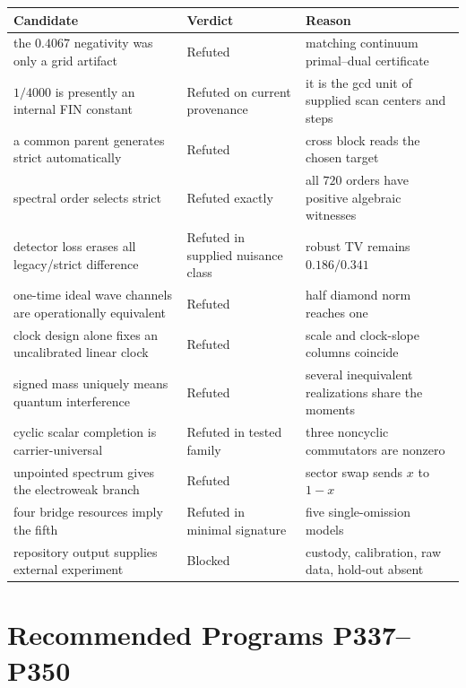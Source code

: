 \documentclass[11pt,a4paper,openany]{report}
\begin{document}
\begin{center}
\begingroup\small
\setlength{\tabcolsep}{2.5pt}
\renewcommand{\arraystretch}{1.16}
\begin{longtable}{@{}p{}p{}p{}@{}}
\toprule
\textbf{Candidate} & \textbf{Verdict} & \textbf{Reason} \\
\midrule
\endhead
the \(0.4067\) negativity was only a grid artifact & Refuted & matching continuum primal--dual certificate \\
\(1/4000\) is presently an internal FIN constant & Refuted on current provenance & it is the gcd unit of supplied scan centers and steps \\
a common parent generates strict automatically & Refuted & cross block reads the chosen target \\
spectral order selects strict & Refuted exactly & all \(720\) orders have positive algebraic witnesses \\
detector loss erases all legacy/\allowbreak{}strict difference & Refuted in supplied nuisance class & robust TV remains \(0.186/0.341\) \\
one-time ideal wave channels are operationally equivalent & Refuted & half diamond norm reaches one \\
clock design alone fixes an uncalibrated linear clock & Refuted & scale and clock-slope columns coincide \\
signed mass uniquely means quantum interference & Refuted & several inequivalent realizations share the moments \\
cyclic scalar completion is carrier-universal & Refuted in tested family & three noncyclic commutators are nonzero \\
unpointed spectrum gives the electroweak branch & Refuted & sector swap sends \(x\) to \(1-x\) \\
four bridge resources imply the fifth & Refuted in minimal signature & five single-omission models \\
repository output supplies external experiment & Blocked & custody, calibration, raw data, hold-out absent \\
\bottomrule
\end{longtable}
\endgroup
\end{center}

\chapter{Recommended Programs P337--P350}
\end{document}
